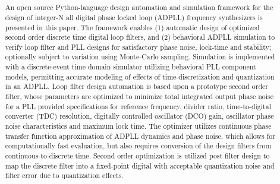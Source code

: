 

\pagestyle{fancy}
\fancyhf{}
\rhead{\fontfamily{\sfdefault}\selectfont \textbf{\rightmark}}

\title{\textbf{}}
\date{}

\sloppy\raggedright
	
	
	\pagebreak
	\thispagestyle{blank}
	\null\pagebreak

	\setcounter{page}{1}
	\pagebreak
	\thispagestyle{nohdr}
	\begin{abstract}
		\large\fontfamily{\rmdefault}\selectfont 
		An open source Python-language design automation and simulation framework for the design of integer-N all digital phase locked loop (ADPLL) frequency synthesizers is presented in this paper. The framework enables (1) automatic design of optimized second order discrete time digital loop filters, and (2) behavioral ADPLL simulation to verify loop filter and PLL designs for satisfactory phase noise, lock-time and stability; optionally subject to variation using Monte-Carlo sampling. Simulation is implemented with a discrete-event time domain simulator utilizing behavioral PLL component models, permitting accurate modeling of effects of time-discretization and quantization in an ADPLL. Loop filter design automation is based upon a prototype second order filter, whose parameters are optimized to minimize total integrated output phase noise for a PLL provided specifications for reference frequency, divider ratio, time-to-digital converter (TDC) resolution, digitally controlled oscillator (DCO) gain, oscillator phase noise characteristics and maximum lock time. The optimizer utilizes continuous phase transfer function approximation of ADPLL dynamics and phase noise, which allows for computationally fast evaluation, but also requires conversion of the design filters from continuous-to-discrete time. Second order optimization is utilized post filter design to map the discrete filter into a fixed-point digital with acceptable quantization noise and filter error due to quantization effects.
	\end{abstract}

